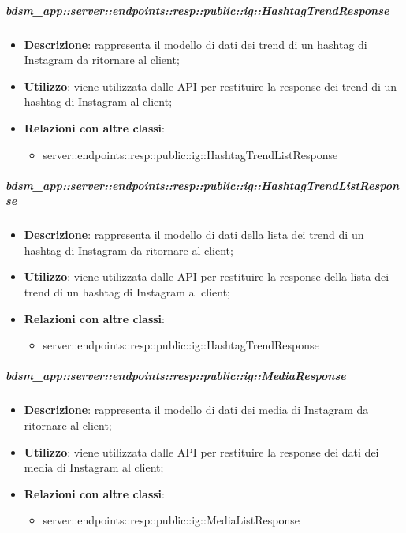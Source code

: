     \subparagraph{bdsm\_app::server::endpoints::resp::public::ig::HashtagTrendResponse} %
    \label{subp:bdsm_app_server_endpoints_resp_public_ig_hashtagtrendresponse}
    \begin{itemize}
      \item \textbf{Descrizione}: rappresenta il modello di dati dei trend di un hashtag di Instagram da ritornare al client;
      \item \textbf{Utilizzo}: viene utilizzata dalle API per restituire la response dei trend di un hashtag di Instagram al client;
      \item \textbf{Relazioni con altre classi}:
        \begin{itemize}
          \item server::endpoints::resp::public::ig::HashtagTrendListResponse
        \end{itemize}
      \end{itemize}
    
    \subparagraph{bdsm\_app::server::endpoints::resp::public::ig::HashtagTrendListResponse} %
    \label{subp:bdsm_app_server_endpoints_resp_public_ig_hashtagtrendlistresponse}
    \begin{itemize}
      \item \textbf{Descrizione}: rappresenta il modello di dati della lista dei trend di un hashtag di Instagram da ritornare al client;
      \item \textbf{Utilizzo}: viene utilizzata dalle API per restituire la response della lista dei trend di un hashtag di Instagram al client;
      \item \textbf{Relazioni con altre classi}:
        \begin{itemize}
          \item server::endpoints::resp::public::ig::HashtagTrendResponse
        \end{itemize}
      \end{itemize}
    
    \subparagraph{bdsm\_app::server::endpoints::resp::public::ig::MediaResponse} %
    \label{subp:bdsm_app_server_endpoints_resp_public_ig_mediaresponse}
    \begin{itemize}
      \item \textbf{Descrizione}: rappresenta il modello di dati dei media di Instagram da ritornare al client;
      \item \textbf{Utilizzo}: viene utilizzata dalle API per restituire la response dei dati dei media di Instagram al client;
      \item \textbf{Relazioni con altre classi}:
        \begin{itemize}
          \item server::endpoints::resp::public::ig::MediaListResponse
        \end{itemize}
      \end{itemize}
    
